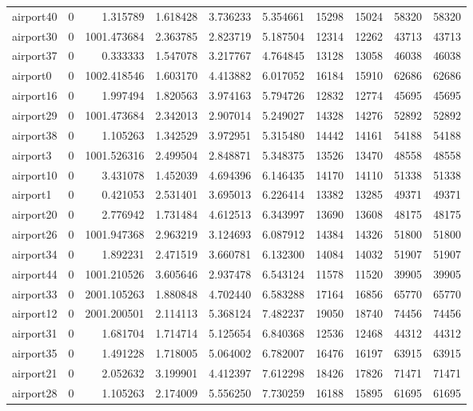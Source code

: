 \begin{longtable}{|l|r|r|r|r|r|r|r|r|r|}
airport40 & 0 & 1.315789 & 1.618428 & 3.736233 & 5.354661 & 15298 & 15024 & 58320 & 58320 \\
airport30 & 0 & 1001.473684 & 2.363785 & 2.823719 & 5.187504 & 12314 & 12262 & 43713 & 43713 \\
airport37 & 0 & 0.333333 & 1.547078 & 3.217767 & 4.764845 & 13128 & 13058 & 46038 & 46038 \\
airport0 & 0 & 1002.418546 & 1.603170 & 4.413882 & 6.017052 & 16184 & 15910 & 62686 & 62686 \\
airport16 & 0 & 1.997494 & 1.820563 & 3.974163 & 5.794726 & 12832 & 12774 & 45695 & 45695 \\
airport29 & 0 & 1001.473684 & 2.342013 & 2.907014 & 5.249027 & 14328 & 14276 & 52892 & 52892 \\
airport38 & 0 & 1.105263 & 1.342529 & 3.972951 & 5.315480 & 14442 & 14161 & 54188 & 54188 \\
airport3 & 0 & 1001.526316 & 2.499504 & 2.848871 & 5.348375 & 13526 & 13470 & 48558 & 48558 \\
airport10 & 0 & 3.431078 & 1.452039 & 4.694396 & 6.146435 & 14170 & 14110 & 51338 & 51338 \\
airport1 & 0 & 0.421053 & 2.531401 & 3.695013 & 6.226414 & 13382 & 13285 & 49371 & 49371 \\
airport20 & 0 & 2.776942 & 1.731484 & 4.612513 & 6.343997 & 13690 & 13608 & 48175 & 48175 \\
airport26 & 0 & 1001.947368 & 2.963219 & 3.124693 & 6.087912 & 14384 & 14326 & 51800 & 51800 \\
airport34 & 0 & 1.892231 & 2.471519 & 3.660781 & 6.132300 & 14084 & 14032 & 51907 & 51907 \\
airport44 & 0 & 1001.210526 & 3.605646 & 2.937478 & 6.543124 & 11578 & 11520 & 39905 & 39905 \\
airport33 & 0 & 2001.105263 & 1.880848 & 4.702440 & 6.583288 & 17164 & 16856 & 65770 & 65770 \\
airport12 & 0 & 2001.200501 & 2.114113 & 5.368124 & 7.482237 & 19050 & 18740 & 74456 & 74456 \\
airport31 & 0 & 1.681704 & 1.714714 & 5.125654 & 6.840368 & 12536 & 12468 & 44312 & 44312 \\
airport35 & 0 & 1.491228 & 1.718005 & 5.064002 & 6.782007 & 16476 & 16197 & 63915 & 63915 \\
airport21 & 0 & 2.052632 & 3.199901 & 4.412397 & 7.612298 & 18426 & 17826 & 71471 & 71471 \\
airport28 & 0 & 1.105263 & 2.174009 & 5.556250 & 7.730259 & 16188 & 15895 & 61695 & 61695 \\

\end{longtable}
